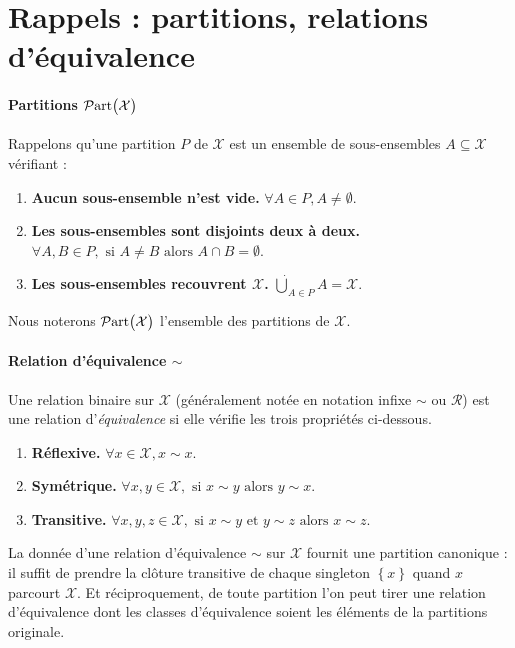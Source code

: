 \section{Rappels : partitions, relations d'équivalence}


\paragraph{Partitions $\mathcal{P}\mathrm{art}\bigl( \mathcal X \bigr)$}

Rappelons qu'une partition $P$ de $\mathcal X$ est un ensemble de sous-ensembles $A \subseteq \mathcal X$ vérifiant :
\begin{enumerate}[label=(\roman*)]
    \item \textbf{Aucun sous-ensemble n'est vide.}  $\forall A \in P, A \neq \emptyset.$
    \item \textbf{Les sous-ensembles sont disjoints deux à deux.} $\forall A, B \in P, \text{ si } A \neq B \text{ alors } A \cap B = \emptyset.$
    \item \textbf{Les sous-ensembles recouvrent $\mathcal X$.}  $\dot\bigcup_{A \in P} A = \mathcal X.$
\end{enumerate}
Nous noterons $\mathcal{P}\mathrm{art}\bigl( \mathcal X \bigr)$ l'ensemble des partitions de $\mathcal X$.

\paragraph{Relation d'équivalence $\sim$}

Une relation binaire sur $\mathcal X$ (généralement notée en notation infixe $\sim$ ou $\mathcal R$) est une relation d'\emph{équivalence} si elle vérifie les trois propriétés ci-dessous.
\begin{enumerate}[label=(\roman*)]
    \item \textbf{Réflexive.} $\forall x \in \mathcal{X}, x \sim x.$
    \item \textbf{Symétrique.} $\forall x, y \in \mathcal{X}, \text{ si } x \sim y \text{ alors } y \sim x.$
    \item \textbf{Transitive.} $\forall x, y, z \in \mathcal{X}, \text{ si } x \sim y \text{ et } y \sim z \text{ alors } x \sim z.$
\end{enumerate}

La donnée d'une relation d'équivalence $\sim$ sur $\mathcal X$ fournit une partition canonique : il suffit de prendre la clôture transitive de chaque singleton $\left\{ x \right\}$ quand $x $ parcourt $\mathcal X$.
Et réciproquement, de toute partition l'on peut tirer une relation d'équivalence dont les classes d'équivalence soient les éléments de la partitions originale.

